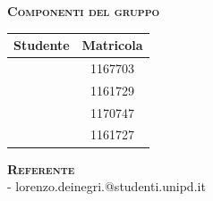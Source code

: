 {\begin{titlepage}
\begin{center}
      \vspace{1cm} 
      
     	\begin{center}
     		\textbf{\textsc{Componenti del gruppo}}\\ \bigskip
			\begin{tabular}{ l | c }
				\textbf{Studente}	& \textbf{Matricola} \\ \hline 
		 		\fiamma 					& 1167703 \\ 
		 		\ludo 						& 1161729 \\ 
		 		\perin 						& 1170747\\ 
				\toffo						& 1161727 \\
			\end{tabular}
		\end{center}

		\vspace{3cm}
			
		\begin{center}
			\textbf{\textsc{Referente}} \\
			\ludo - lorenzo.deinegri.@studenti.unipd.it \\
		\end{center}
			
		\end{center}
	\end{titlepage}
\pagebreak
}

